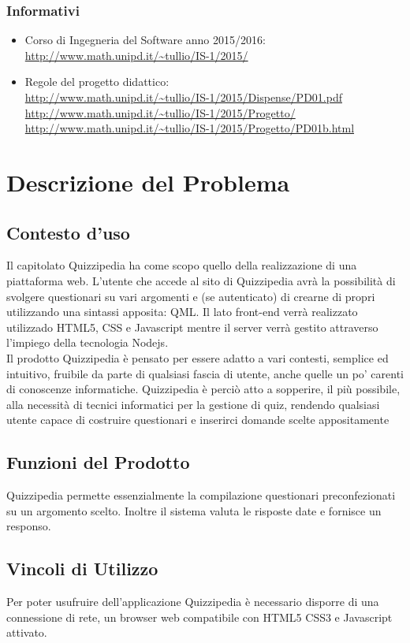 \documentclass[a4paper,11pt]{article}
\begin{document}
		\subsubsection{Informativi}
		\begin{itemize}
			\item Corso di Ingegneria del Software anno 2015/2016:\\
			\url{http://www.math.unipd.it/~tullio/IS-1/2015/}
			\item Regole del progetto didattico:\\
			\url{http://www.math.unipd.it/~tullio/IS-1/2015/Dispense/PD01.pdf}
			\url{http://www.math.unipd.it/~tullio/IS-1/2015/Progetto/}\\
			\url{http://www.math.unipd.it/~tullio/IS-1/2015/Progetto/PD01b.html}
		\end{itemize}
	\pagebreak

	\newpage	
	\section{Descrizione del Problema}
	\subsection{Contesto d'uso}
		Il capitolato Quizzipedia ha come scopo quello della realizzazione di una piattaforma web. L'utente che accede al sito di Quizzipedia avrà la possibilità di svolgere questionari su vari argomenti e (se autenticato) di crearne di propri utilizzando una sintassi apposita: QML. Il lato front-end verrà realizzato utilizzado HTML5, CSS e Javascript mentre il server verrà gestito attraverso l'impiego della tecnologia Nodejs.\\
		Il prodotto Quizzipedia è pensato per essere adatto a vari contesti, semplice ed intuitivo, fruibile da parte di qualsiasi fascia di utente, anche quelle un po' carenti di conoscenze informatiche. Quizzipedia è perciò atto a sopperire, il più possibile, alla necessità di tecnici informatici per la gestione di quiz, rendendo qualsiasi utente capace di costruire questionari e inserirci domande scelte appositamente
	\subsection{Funzioni del Prodotto}
		Quizzipedia permette essenzialmente la compilazione questionari preconfezionati su un argomento scelto. Inoltre il sistema valuta le risposte date e fornisce un responso.
	\subsection{Vincoli di Utilizzo}
		Per poter usufruire dell'applicazione Quizzipedia è necessario disporre di una connessione di
rete, un browser web compatibile con HTML5 CSS3 e Javascript attivato.
	
\end{document}
